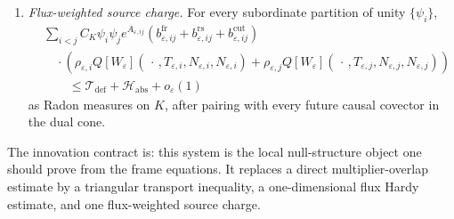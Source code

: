 \begin{definition}
\begin{enumerate}
    \[
    \begin{split}
        &\sum_{i<j}
        C_K\psi_i\psi_j
        \mathcal H_{\varepsilon,ij}f_{\varepsilon,ij}
        \left(
            \rho_{\varepsilon,i}Q[W_\varepsilon](\,\cdot\,,T_{\varepsilon,i},N_{\varepsilon,i},N_{\varepsilon,i})
            +
            \rho_{\varepsilon,j}Q[W_\varepsilon](\,\cdot\,,T_{\varepsilon,j},N_{\varepsilon,j},N_{\varepsilon,j})
        \right) \\
        &\qquad\le
        \sum_{i<j}
        C_K\psi_i\psi_j
        e^{A_{\varepsilon,ij}}f_{\varepsilon,ij}
        \left(
            \rho_{\varepsilon,i}Q[W_\varepsilon](\,\cdot\,,T_{\varepsilon,i},N_{\varepsilon,i},N_{\varepsilon,i})
            +
            \rho_{\varepsilon,j}Q[W_\varepsilon](\,\cdot\,,T_{\varepsilon,j},N_{\varepsilon,j},N_{\varepsilon,j})
        \right)
        +o_\varepsilon(1)
    \end{split}
    \]
    after pairing with every future causal covector.  This is the only one-dimensional Hardy input in the transition system.
    \item \emph{Flux-weighted source charge.} For every subordinate partition of unity $\{\psi_i\}$,
    \[
    \begin{split}
        &\sum_{i<j}
        C_K\psi_i\psi_j
        e^{A_{\varepsilon,ij}}
        \left(
            b^{\mathrm{fr}}_{\varepsilon,ij}
            +
            b^{\mathrm{rs}}_{\varepsilon,ij}
            +
            b^{\mathrm{cut}}_{\varepsilon,ij}
        \right) \\
        &\quad\cdot
        \left(
            \rho_{\varepsilon,i}Q[W_\varepsilon](\,\cdot\,,T_{\varepsilon,i},N_{\varepsilon,i},N_{\varepsilon,i})
            +
            \rho_{\varepsilon,j}Q[W_\varepsilon](\,\cdot\,,T_{\varepsilon,j},N_{\varepsilon,j},N_{\varepsilon,j})
        \right) \\
        &\qquad\le
        \mathcal T_{\mathrm{def}}+\mathcal H_{\mathrm{abs}}+o_\varepsilon(1)
    \end{split}
    \]
    as Radon measures on $K$, after pairing with every future causal covector in the dual cone.
\end{enumerate}
The innovation contract is: this system is the local null-structure object one should prove from the frame equations.  It replaces a direct multiplier-overlap estimate by a triangular transport inequality, a one-dimensional flux Hardy estimate, and one flux-weighted source charge.
\end{definition}

